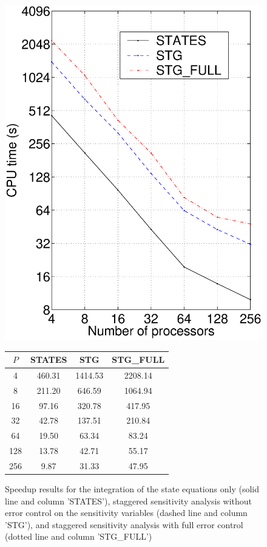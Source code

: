\begin{figure}
  \begin{minipage}[c]{.5\textwidth}
    \centering
    \includegraphics[width=.85\textwidth]{pvfktTest.eps}
  \end{minipage}
  \begin{minipage}[c]{.5\textwidth}
    \centering
    \begin{tabularx}{\textwidth}{cccc}\hline
      $P$ &  STATES  &   STG   & STG\_FULL \\ \hline
      4  &  460.31  &  1414.53  & 2208.14  \\
      8  &  211.20  &   646.59  & 1064.94  \\
     16  &   97.16  &   320.78  &  417.95  \\
     32  &   42.78  &   137.51  &  210.84  \\
     64  &   19.50  &    63.34  &   83.24  \\
     128  &   13.78  &    42.71  &   55.17  \\
     256  &    9.87  &    31.33  &   47.95  \\ \hline
   \end{tabularx}
 \end{minipage}
 \caption[Speedup results on a sensitivity problem]
 {Speedup results for the integration of the state equations only
   (solid line and column 'STATES'), staggered sensitivity analysis without
   error control on the sensitivity variables (dashed line and column 'STG'),
   and staggered sensitivity analysis with full error control (dotted line and
   column 'STG\_FULL')}
 \label{f:pvfktTest}
\end{figure}


